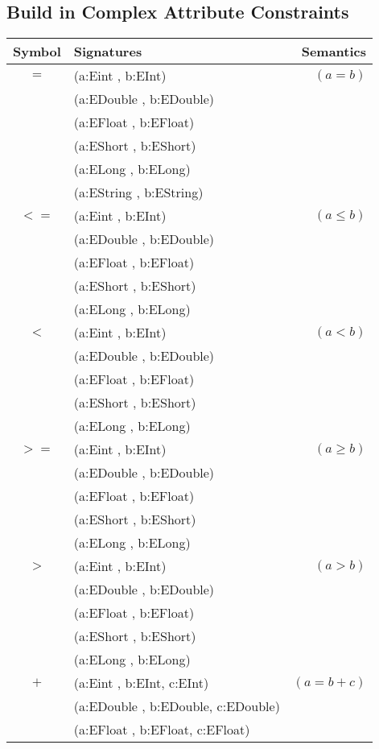 \subsection{Build in Complex Attribute Constraints}  
\begin{center} \begin{tabular}{| c| l | r |} \hline 
Symbol & Signatures  & Semantics \\ \hline \hline 
$=$ & (a:Eint , b:EInt) & $(a=b)$ \\ 
 & (a:EDouble , b:EDouble) & \\ 
 & (a:EFloat , b:EFloat) &  \\ 
 & (a:EShort , b:EShort) & \\ 
 & (a:ELong , b:ELong) &  \\ 
 & (a:EString , b:EString) & \\\hline
 $<=$ & (a:Eint , b:EInt) & $(a\leq b)$ \\ 
 & (a:EDouble , b:EDouble) & \\ 
 & (a:EFloat , b:EFloat) &  \\ 
 & (a:EShort , b:EShort) & \\ 
 & (a:ELong , b:ELong) &  \\\hline
 $<$ & (a:Eint , b:EInt) & $(a < b)$ \\ 
 & (a:EDouble , b:EDouble) & \\ 
 & (a:EFloat , b:EFloat) &  \\ 
 & (a:EShort , b:EShort) & \\ 
 & (a:ELong , b:ELong) &  \\\hline
 $>=$ & (a:Eint , b:EInt) & $(a\geq b)$ \\ 
 & (a:EDouble , b:EDouble) & \\ 
 & (a:EFloat , b:EFloat) &  \\ 
 & (a:EShort , b:EShort) & \\ 
 & (a:ELong , b:ELong) &  \\\hline
 $>$ & (a:Eint , b:EInt) & $(a > b)$ \\ 
 & (a:EDouble , b:EDouble) & \\ 
 & (a:EFloat , b:EFloat) &  \\ 
 & (a:EShort , b:EShort) & \\ 
 & (a:ELong , b:ELong) &  \\\hline
$+$ & (a:Eint , b:EInt, c:EInt) & $(a=b+c)$ \\ 
 & (a:EDouble , b:EDouble, c:EDouble) & \\ 
 & (a:EFloat , b:EFloat, c:EFloat) &  \\ 

\end{tabular}
\end{center}
